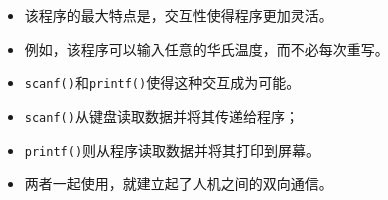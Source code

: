 \begin{frame}[fragile]\ft{\secname}
\begin{itemize}
\item
该程序的最大特点是，交互性使得程序更加灵活。\\[0.1in]
\item[] 例如，该程序可以输入任意的华氏温度，而不必每次重写。\\[0.2in]
\item \lstinline|scanf()|和\lstinline|printf()|使得这种交互成为可能。\\[0.1in]
\item[] \lstinline|scanf()|从键盘读取数据并将其传递给程序；\\[0.1in]
\item[] \lstinline|printf()|则从程序读取数据并将其打印到屏幕。\\[0.1in]
\item[] 两者一起使用，就建立起了人机之间的双向通信。
\end{itemize}

\end{frame}




